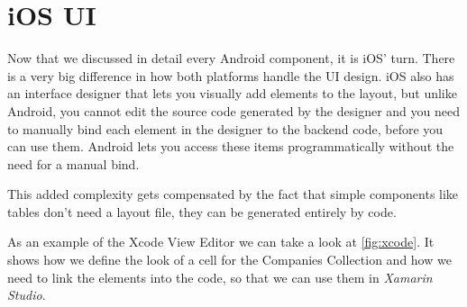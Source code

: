 
%

%




\section{iOS UI}

Now that we discussed in detail every Android component, it is iOS' turn. There is a very big difference in how both platforms handle the \ac{UI} design. iOS also has an interface designer that lets you visually add elements to the layout, but unlike Android, you cannot edit the source code generated by the designer and you need to manually bind each element in the designer to the backend code, before you can use them. Android lets you access these items programmatically without the need for a manual bind.

This added complexity gets compensated by the fact that simple components like tables don't need a layout file, they can be generated entirely by code.

As an example of the Xcode View Editor we can take a look at \autoref{fig:xcode}. It shows how we define the look of a cell for the Companies Collection and how we need to link the elements into the code, so that we can use them in \textit{Xamarin Studio}.

